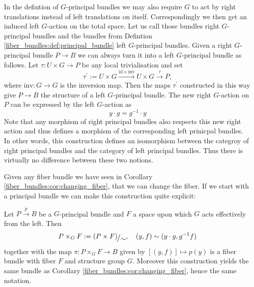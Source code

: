 \needspace{5cm}

\begin{remark}
    In the defintion of $G$-principal bundles we may also require $G$ to act by right translations instead of left translations on itself. Correspondingly we then get an induced left $G$-action on the total space. Let us call those bundles right $G$-principal bundles and the bundles from Defintion \ref{fiber_bundles:def:principal_bundle} left $G$-principal bundles. Given a right $G$-principal bundle $P \to B$ we can always turn it into a left $G$-principal bundle as follows. Let $\tau \colon U \times G \to P$ be any local trivialisation and set 
    \[
    \tau^\prime := U \times G \xrightarrow{\mathrm{id} \times \mathrm{inv}} U \times G \xrightarrow{\tau} P,
    \]
    where $\mathrm{inv} \colon G \to G$ is the inversion map. Then the maps $\tau^\prime$ constructed in this way give $P \to B$ the structure of a left $G$-principal bundle. The new right $G$-action on $P$ can be expressed by the left $G$-action as 
    \[
    y \cdot g = g^{-1} \cdot y
    \]
    Note that any morphism of right principal bundles also respects this new right action and thus defines a morphism of the corresponding left prinicpal bundles. In other words, this construction defines an isomorphism between the categroy of right principal bundles and the category of left principal bundles. Thus there is virtually no difference between these two notions.
\end{remark}

Given any fiber bundle we have seen in Corollary \ref{fiber_bundles:cor:changing_fiber}, that we can change the fiber. If we start with a principal bundle we can make this construction quite explicit:

\begin{lemma}
    \label{fiber_bundles:lem:borel_construction}
    Let $P \xrightarrow{p} B$ be a $G$-principal bundle and $F$ a space upon which $G$ acts effectively from the left. Then 
    \[
    P \times_G F := \modulo{(P \times F)}{\sim}, \quad (y,f) \sim (y\cdot g, g^{-1}f)
    \]
    together with the map $\pi \colon P \times_G F \to B$ given by $[(y,f)] \mapsto p(y)$ is a fiber bundle with fiber $F$ and structure group $G$. Moreover this construction yields the same bundle as Corollary \ref{fiber_bundles:cor:changing_fiber}, hence the same notation.
\end{lemma}

